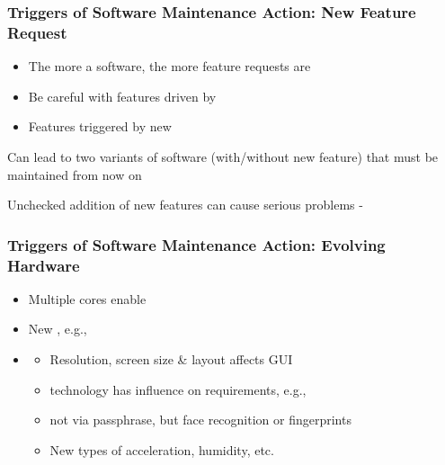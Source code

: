 \subsubsection*{Triggers of Software Maintenance Action: New Feature Request}
\begin{itemize}
    \item The more  a software, the more  feature requests are\\
    \item Be careful with features driven by \\
    \item Features triggered by new \\
\end{itemize}
\begin{defBox}
    Can lead to two variants of software (with/without new feature) that  must be maintained from now on
\end{defBox}
\begin{defBox}
    Unchecked addition of new features can cause serious problems - 
\end{defBox}
\subsubsection*{Triggers of Software Maintenance Action: Evolving Hardware}
\begin{itemize}
    \item Multiple cores enable  
    \item New , e.g., 
    \item {}
    \begin{itemize}
        \item {} Resolution, screen size \& layout affects GUI
        \item {} technology has influence on  requirements, e.g., 
        \item {} not via passphrase, but face recognition or fingerprints
        \item New types of  acceleration, humidity, etc.
    \end{itemize}
\end{itemize}
